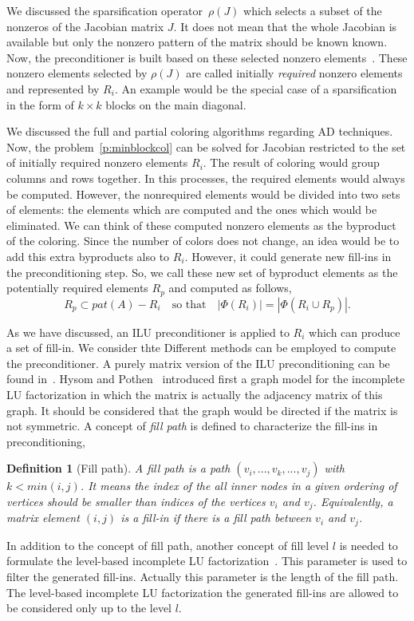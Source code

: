 \documentclass[12pt, oneside]{book}
\newtheorem{definition}{Definition}
\newcommand{\sparsifysymbol}{\ensuremath{\rho}}
\newcommand{\sparsify}[1]{\ensuremath{\sparsifysymbol(#1)}}
\begin{document}
We discussed the sparsification operator~\sparsify{J} 
which selects a subset of the nonzeros of the Jacobian matrix $J$. 
It does not mean that the whole Jacobian is available but 
only the nonzero pattern of the matrix should be known known.
Now, the preconditioner is built based on these selected nonzero elements~\cite{Cullum2006}.
These nonzero elements selected by \sparsify{J} are called initially 
\emph{required} nonzero elements and represented by $R_i$. 
An example would be the special case of a sparsification in the form of $k\times k$
blocks on the main diagonal.

We discussed the full and partial coloring algorithms regarding AD techniques. 
Now, the problem~\ref{p:minblockcol} can be solved for Jacobian
restricted to the set of initially
required nonzero elements $R_i$. The result of coloring would group
columns and rows together. In this processes, the required elements would always
be computed. However, the nonrequired elements would be divided into two sets of
elements: the elements which are computed and the ones which would be 
eliminated. We can think of these computed nonzero elements as the byproduct
of the coloring. Since the number of colors does not change, 
an idea would be to add this extra byproducts also to $R_i$.
However, it could generate new fill-ins in the preconditioning step.
So, we call these new set of byproduct elements as the potentially
required elements $R_p$ and computed as follows,
$$
R_p \subset pat(A) - R_i \quad\text{so that}\quad |\Phi(R_i)| = |\Phi(R_i\cup R_p)|.
$$ 

As we have discussed, an ILU preconditioner is applied to $R_i$ which can
produce a set of fill-in. 
We consider thte 
Different methods can be employed to compute the preconditioner.
A purely matrix version of the ILU preconditioning can be found in~\cite{cscpaper}.
Hysom and Pothen~\cite{precond-pothen} introduced first a graph model for the incomplete
LU factorization in which the matrix is actually the adjacency matrix of this graph.
It should be considered that the graph would be directed if the matrix is not symmetric.
A concept of \textit{fill path} is defined to characterize the fill-ins in preconditioning,
\begin{definition}[Fill path]\label{d.fill.path}
A fill path is a path $(v_i,...,v_k,...,v_j)$ with
$k<min(i,j)$. It means the index of the all inner nodes in a given ordering of vertices
should be smaller than indices of the vertices $v_i$ and $v_j$. 
Equivalently, a matrix element $(i,j)$ is a fill-in if there is a fill path between
$v_i$ and $v_j$.
\end{definition}
In addition to the concept of fill path, another concept of fill level $l$ is needed to 
formulate the level-based incomplete LU factorization~\cite{precond-pothen}.
This parameter is used to filter the generated fill-ins. 
Actually this parameter is the length of the fill path.
The level-based incomplete LU factorization the generated fill-ins are allowed
to be considered only up to the level $l$.
\end{document}
